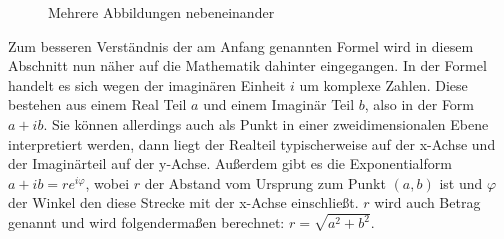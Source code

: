 \begin{figure}[bth]
  \hfill
  \hfill
  \centering{}
  \caption{Mehrere Abbildungen nebeneinander}
  \label{fig:dftEinzelneFrequenzen}
\end{figure}

Zum besseren Verständnis der am Anfang genannten Formel wird in diesem Abschnitt nun näher auf die Mathematik dahinter eingegangen. In der Formel handelt es sich wegen der imaginären Einheit $i$ um komplexe Zahlen. Diese bestehen aus einem Real Teil $a$ und einem Imaginär Teil $b$, also in der Form $a + ib$. Sie können allerdings auch als Punkt in einer zweidimensionalen Ebene interpretiert werden, dann liegt der Realteil typischerweise auf der x-Achse und der Imaginärteil auf der y-Achse. Außerdem gibt es die Exponentialform $a+ib=re^{i\varphi}$, wobei $r$ der Abstand vom Ursprung zum Punkt $(a,b)$ ist und $\varphi$ der Winkel den diese Strecke mit der x-Achse einschließt. $r$ wird auch Betrag genannt und wird folgendermaßen berechnet: $r=\sqrt{a^2+b^2}$. 